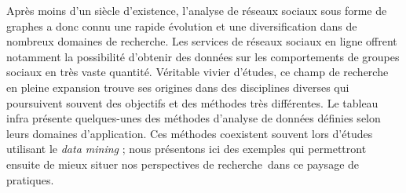 Après moins d{\textquoteright}un siècle d{\textquoteright}existence, l{\textquoteright}analyse de réseaux sociaux sous forme de graphes a donc connu une rapide évolution et une diversification dans de nombreux domaines de recherche. Les services de réseaux sociaux en ligne offrent notamment la possibilité d{\textquoteright}obtenir des données sur les comportements de groupes sociaux en très vaste quantité. Véritable vivier d{\textquoteright}études, ce champ de recherche en pleine expansion trouve ses origines dans des disciplines diverses qui poursuivent souvent des objectifs et des méthodes très différentes. Le tableau infra présente quelques-unes des méthodes d{\textquoteright}analyse de données définies selon leurs domaines d{\textquoteright}application. Ces méthodes coexistent souvent lors d{\textquoteright}études utilisant le \textit{data mining} ; nous présentons ici des exemples qui permettront ensuite de mieux situer nos perspectives de recherche~dans ce paysage de pratiques.

